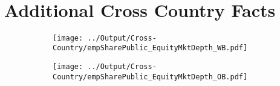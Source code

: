 \documentclass[12pt,notitlepage]{article}
\begin{document}
\begin{table}[!htpb]
\caption{Number of Employees: Orbis (OB) vs. CompuStat (CS)}
\tabularnewline \\

\end{table}


\clearpage
\appendix


\FloatBarrier
\section{Additional Cross Country Facts} %
\label{sec:additional_cross_country_facts}
\FloatBarrier

\begin{figure}[!htpb]
\centering
\caption{Share of Employment in Public Firms}
\begin{subfigure}{.49\textwidth}
    \centering
 \texttt{[image: ../Output/Cross-Country/empSharePublic\_EquityMktDepth\_WB.pdf]}
\end{subfigure}
\begin{subfigure}{.49\textwidth}
    \centering
  \texttt{[image: ../Output/Cross-Country/empSharePublic\_EquityMktDepth\_OB.pdf]}
\end{subfigure}
\end{figure}
\FloatBarrier
\end{document}
